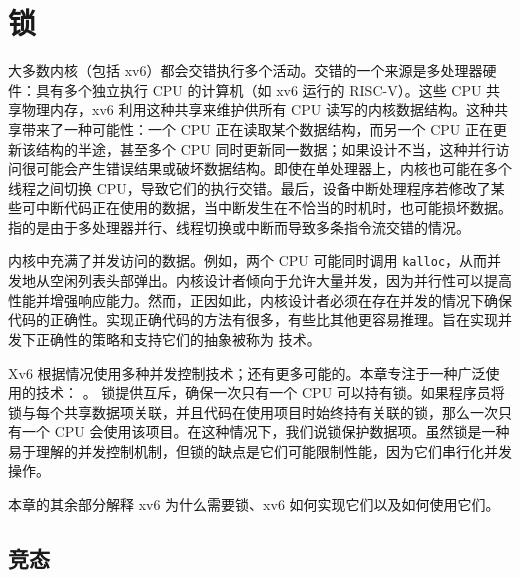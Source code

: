 \chapter{锁}
\label{CH:LOCK}

大多数内核（包括 xv6）都会交错执行多个活动。交错的一个来源是多处理器硬件：具有多个独立执行 CPU 的计算机（如 xv6 运行的 RISC-V）。这些 CPU 共享物理内存，xv6 利用这种共享来维护供所有 CPU 读写的内核数据结构。这种共享带来了一种可能性：一个 CPU 正在读取某个数据结构，而另一个 CPU 正在更新该结构的半途，甚至多个 CPU 同时更新同一数据；如果设计不当，这种并行访问很可能会产生错误结果或破坏数据结构。即使在单处理器上，内核也可能在多个线程之间切换 CPU，导致它们的执行交错。最后，设备中断处理程序若修改了某些可中断代码正在使用的数据，当中断发生在不恰当的时机时，也可能损坏数据。
指的是由于多处理器并行、线程切换或中断而导致多条指令流交错的情况。

内核中充满了并发访问的数据。例如，两个 CPU 可能同时调用 {\tt kalloc}，从而并发地从空闲列表头部弹出。内核设计者倾向于允许大量并发，因为并行性可以提高性能并增强响应能力。然而，正因如此，内核设计者必须在存在并发的情况下确保代码的正确性。实现正确代码的方法有很多，有些比其他更容易推理。旨在实现并发下正确性的策略和支持它们的抽象被称为
技术。

Xv6 根据情况使用多种并发控制技术；还有更多可能的。本章专注于一种广泛使用的技术：
。
锁提供互斥，确保一次只有一个 CPU 可以持有锁。如果程序员将锁与每个共享数据项关联，并且代码在使用项目时始终持有关联的锁，那么一次只有一个 CPU 会使用该项目。在这种情况下，我们说锁保护数据项。虽然锁是一种易于理解的并发控制机制，但锁的缺点是它们可能限制性能，因为它们串行化并发操作。

本章的其余部分解释 xv6 为什么需要锁、xv6 如何实现它们以及如何使用它们。


% 

\section{竞态}

